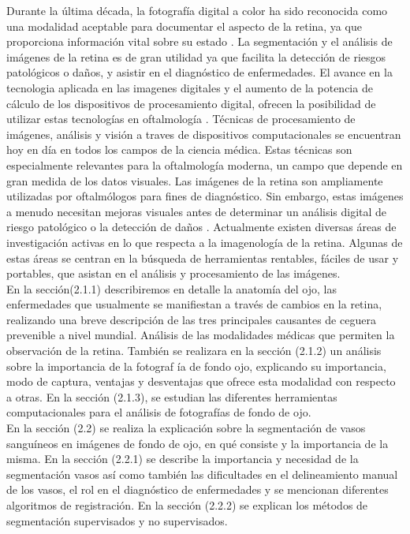 Durante la \'ultima d\'ecada, la fotograf\'ia digital a color ha sido reconocida como una modalidad aceptable para documentar el aspecto de la retina, ya que proporciona informaci\'on vital sobre su estado \cite{patton2006retinal} \cite{cummings2002organisation} \cite{fransen2002clinical} \cite{hansen2004screening} \cite{klein2004comparability}.  La segmentaci\'on y el an\'alisis de im\'agenes de la retina es de gran utilidad ya que facilita la detecci\'on de riesgos patol\'ogicos o da\~nos, y asistir en el diagn\'ostico de enfermedades. 
El avance en la tecnologia aplicada en las imagenes digitales y  el aumento de la potencia de c\'alculo de los dispositivos de procesamiento digital, ofrecen la posibilidad de utilizar estas tecnolog\'ias en oftalmolog\'ia \cite{van2003grading}. 
T\'ecnicas de procesamiento de imágenes, análisis y visión a traves de dispositivos computacionales se encuentran hoy en d\'ia en todos los campos de la ciencia m\'edica. Estas técnicas son especialmente relevantes para la oftalmología moderna, un campo que depende en gran medida de los datos visuales. Las im\'agenes de la retina son ampliamente utilizadas por oftalm\'ologos para fines de diagn\'ostico. Sin embargo, estas im\'agenes a menudo necesitan mejoras visuales antes de determinar un an\'alisis digital de riesgo patol\'ogico o la detecci\'on de da\~nos  \cite{marrugo2011retinal}.
Actualmente existen diversas \'areas de investigación activas en lo que respecta a la imagenología de la retina. Algunas de estas \'areas se centran en la b\'usqueda de herramientas rentables, f\'aciles de usar y portables, que asistan en el an\'alisis y procesamiento de las im\'agenes.\\


En la secci\'on(2.1.1) describiremos en detalle la anatom\'ia del ojo, las enfermedades que usualmente se manifiestan a trav\'es de cambios en la retina, realizando una breve descripci\'on de las tres principales causantes de ceguera prevenible a nivel mundial. An\'alisis de las modalidades m\'edicas que permiten la observaci\'on de la retina. Tambi\'en se realizara en la secci\'on (2.1.2) un an\'alisis sobre la importancia de la fotograf \'ia de fondo ojo, explicando su importancia, modo de captura, ventajas y desventajas que ofrece esta modalidad con respecto a otras. En la secci\'on (2.1.3), se estudian las diferentes herramientas computacionales para el an\'alisis de fotograf\'ias de fondo de ojo.\\

En la secci\'on (2.2) se realiza la explicaci\'on sobre la segmentaci\'on de vasos sangu\'ineos en im\'agenes de fondo de ojo, en qu\'e consiste y la importancia de la misma.
En la secci\'on (2.2.1) se describe la importancia y necesidad de la segmentaci\'on vasos  as\'i como tambi\'en las dificultades en el delineamiento manual de los vasos, el rol en el diagn\'ostico de enfermedades y se mencionan diferentes algoritmos de registraci\'on.
En la secci\'on (2.2.2) se explican los m\'etodos de segmentaci\'on supervisados y no supervisados.
